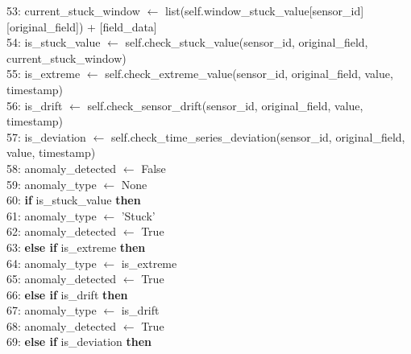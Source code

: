 \begin{breakablealgorithm}[H]
\begin{flushleft}
53: \hspace{1em} current\_stuck\_window $\gets$ list(self.window\_stuck\_value[sensor\_id][original\_field]) + [field\_data] \\
54: \hspace{1em} is\_stuck\_value $\gets$ self.check\_stuck\_value(sensor\_id, original\_field, current\_stuck\_window) \\
55: \hspace{1em} is\_extreme $\gets$ self.check\_extreme\_value(sensor\_id, original\_field, value, timestamp) \\
56: \hspace{1em} is\_drift $\gets$ self.check\_sensor\_drift(sensor\_id, original\_field, value, timestamp) \\
57: \hspace{1em} is\_deviation $\gets$ self.check\_time\_series\_deviation(sensor\_id, original\_field, value, timestamp) \\
58: \hspace{1em} anomaly\_detected $\gets$ False \\
59: \hspace{1em} anomaly\_type $\gets$ None \\
60: \hspace{1em} \textbf{if} is\_stuck\_value \textbf{then} \\
61: \hspace{1.5em} anomaly\_type $\gets$ 'Stuck' \\
62: \hspace{1.5em} anomaly\_detected $\gets$ True \\
63: \hspace{1em} \textbf{else if} is\_extreme \textbf{then} \\
64: \hspace{1.5em} anomaly\_type $\gets$ is\_extreme \\
65: \hspace{1.5em} anomaly\_detected $\gets$ True \\
66: \hspace{1em} \textbf{else if} is\_drift \textbf{then} \\
67: \hspace{1.5em} anomaly\_type $\gets$ is\_drift \\
68: \hspace{1.5em} anomaly\_detected $\gets$ True \\
69: \hspace{1em} \textbf{else if} is\_deviation \textbf{then} \\

\end{flushleft}
\end{breakablealgorithm}
